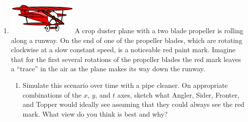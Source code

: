 \begin{enumerate}[resume]
\item \includegraphics{09/09fig1} A crop duster plane with a two blade propeller is rolling along a runway. On the end of one of the propeller blades, which are rotating clockwise at a slow constant speed, is a noticeable red paint mark. Imagine that for the first several rotations of the propeller blades the red mark leaves a ``trace'' in the air as the plane makes its way down the runway.  \label{09problem3}

\begin{enumerate}
\item Simulate this scenario over time with a pipe cleaner. On appropriate combinations of the $x$, $y$, and $t$ axes, sketch what Angler, Sider, Fronter, and Topper would ideally see assuming that they could always see the red mark. What view do you think is best and why? \label{09problem3parta}



\end{enumerate}
\end{enumerate}
